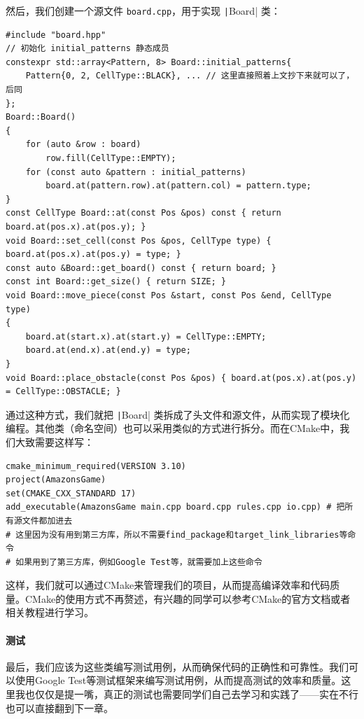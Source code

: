然后，我们创建一个源文件 \verb|board.cpp|，用于实现 \texttt|Board| 类：
\begin{verbatim}
#include "board.hpp"
// 初始化 initial_patterns 静态成员
constexpr std::array<Pattern, 8> Board::initial_patterns{
    Pattern{0, 2, CellType::BLACK}, ... // 这里直接照着上文抄下来就可以了，后同
};
Board::Board()
{
    for (auto &row : board)
        row.fill(CellType::EMPTY);
    for (const auto &pattern : initial_patterns)
        board.at(pattern.row).at(pattern.col) = pattern.type;
}
const CellType Board::at(const Pos &pos) const { return board.at(pos.x).at(pos.y); }
void Board::set_cell(const Pos &pos, CellType type) { board.at(pos.x).at(pos.y) = type; }
const auto &Board::get_board() const { return board; }
const int Board::get_size() { return SIZE; }
void Board::move_piece(const Pos &start, const Pos &end, CellType type)
{
    board.at(start.x).at(start.y) = CellType::EMPTY;
    board.at(end.x).at(end.y) = type;
}
void Board::place_obstacle(const Pos &pos) { board.at(pos.x).at(pos.y) = CellType::OBSTACLE; }
\end{verbatim}
通过这种方式，我们就把 \texttt|Board| 类拆成了头文件和源文件，从而实现了模块化编程。其他类（命名空间）也可以采用类似的方式进行拆分。而在CMake中，我们大致需要这样写：
\begin{verbatim}
cmake_minimum_required(VERSION 3.10)
project(AmazonsGame)
set(CMAKE_CXX_STANDARD 17)
add_executable(AmazonsGame main.cpp board.cpp rules.cpp io.cpp) # 把所有源文件都加进去
# 这里因为没有用到第三方库，所以不需要find_package和target_link_libraries等命令
# 如果用到了第三方库，例如Google Test等，就需要加上这些命令
\end{verbatim}
这样，我们就可以通过CMake来管理我们的项目，从而提高编译效率和代码质量。CMake的使用方式不再赘述，有兴趣的同学可以参考CMake的官方文档或者相关教程进行学习。

\paragraph{测试}
最后，我们应该为这些类编写测试用例，从而确保代码的正确性和可靠性。我们可以使用Google Test等测试框架来编写测试用例，从而提高测试的效率和质量。这里我也仅仅是提一嘴，真正的测试也需要同学们自己去学习和实践了——实在不行也可以直接翻到下一章。
